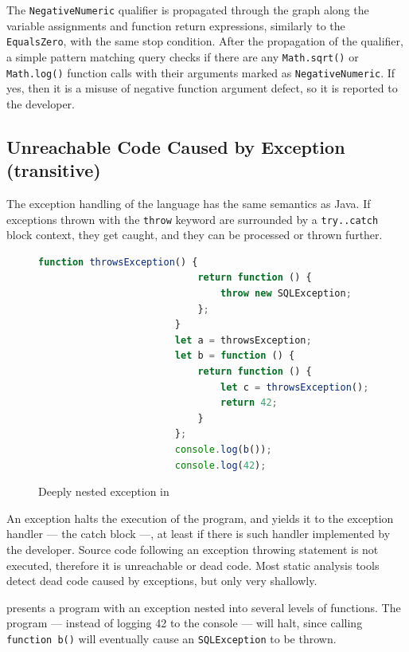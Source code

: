 The \lstinline{NegativeNumeric} qualifier is propagated through the graph along the variable assignments and function return expressions, similarly to the \lstinline{EqualsZero}, with the same stop condition. After the propagation of the qualifier, a simple pattern matching query checks if there are any \lstinline{Math.sqrt()} or \lstinline{Math.log()} function calls with their arguments marked as \lstinline{NegativeNumeric}. If yes, then it is a misuse of negative function argument defect, so it is reported to the developer.


\subsection{Unreachable Code Caused by Exception (transitive)}

The exception handling of the \es language has the same semantics as Java. If exceptions thrown with the \lstinline{throw} keyword are surrounded by a \lstinline{try..catch} block context, they get caught, and they can be processed or thrown further.

\begin{figure}[!htb]
	\centering
	\begin{lstlisting}[language=JavaScript]
						function throwsException() {
						    return function () {
						        throw new SQLException;
						    };
						}
						let a = throwsException;
						let b = function () {
						    return function () {
						        let c = throwsException();
						        return 42;
						    }
						};
						console.log(b());
						console.log(42);
	\end{lstlisting}
  \caption{Deeply nested exception in \es}
  \label{fig:deeply-nested-exception}
\end{figure}

An exception halts the execution of the program, and yields it to the exception handler — the catch block —, at least if there is such handler implemented by the developer. Source code following an exception throwing statement is not executed, therefore it is unreachable or dead code. Most static analysis tools detect dead code caused by exceptions, but only very shallowly.

 presents a program with an exception nested into several levels of functions. The program — instead of logging 42 to the console — will halt, since calling \lstinline{function b()} will eventually cause an \lstinline{SQLException} to be thrown.

